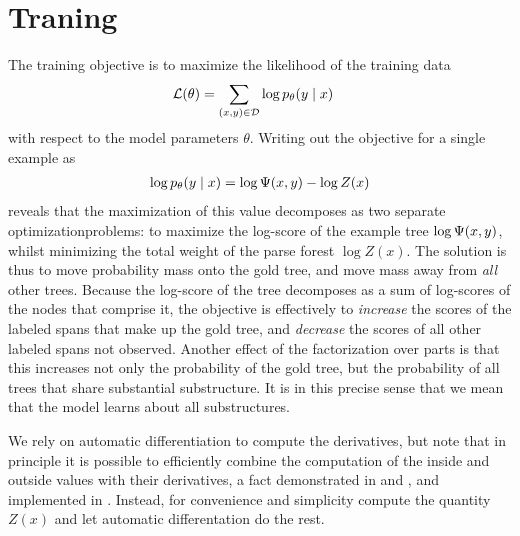 \section{Traning}
  The training objective is to maximize the likelihood of the training data
  \begin{align*}
    \mathcal{L}(\theta)
      &= \sum_{(x, y) \in \mathcal{D}} \log p_{\theta}(y \mid x)
  \end{align*}
  with respect to the model parameters $\theta$. Writing out the objective for a single example as
  \begin{align*}
    \log p_{\theta}(y \mid x) = \log \Psi(x, y) - \log Z(x)
  \end{align*}
  reveals that the maximization of this value decomposes as two separate optimizationproblems: to maximize the log-score of the example tree $\log \Psi(x, y)$, whilst minimizing the total weight of the parse forest $\log Z(x)$. The solution is thus to move probability mass onto the gold tree, and move mass away from \textit{all} other trees. Because the log-score of the tree decomposes as a sum of log-scores of the nodes that comprise it, the objective is effectively to \textit{increase} the scores of the labeled spans that make up the gold tree, and \textit{decrease} the scores of all other labeled spans not observed. Another effect of the factorization over parts is that this increases not only the probability of the gold tree, but the probability of all trees that share substantial substructure. It is in this precise sense that we mean that the model learns about all substructures.

  We rely on automatic differentiation to compute the derivatives, but note that in principle it is possible to efficiently combine the computation of the inside and outside values with their derivatives, a fact demonstrated in \citep{eisner2009semirings} and \citep{eisner2016backprop}, and implemented in \citep{kim2017structured}. Instead, for convenience and simplicity compute the quantity $Z(x)$ and let automatic differentation do the rest.

